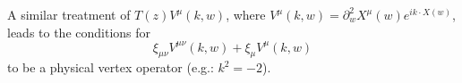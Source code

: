 \documentclass[10pt,a4paper]{article}
\begin{document}
    A similar treatment of $T\left( z \right) V^{\mu}\left( k, w \right)$,
    where $V^{\mu}\left( k, w \right) = \partial^2_w X^{\mu}\left( w \right)
    e^{i k \cdot X\left( w \right)}$, leads to the conditions for
    \begin{equation*}
        \xi_{\mu\nu} V^{\mu\nu}\left( k, w \right) + \xi_{\mu} V^{\mu}\left( k,
        w \right)
    \end{equation*}
    to be a physical vertex operator (e.g.: $k^2 = -2$).
\end{document}
